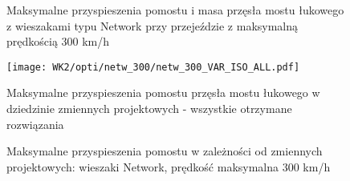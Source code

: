 \begin{figure}[hbt!]
	\centering
	\captionsetup{justification=centering}
	\caption{Maksymalne przyspieszenia pomostu i masa przęsła mostu łukowego z wieszakami typu Network przy przejeździe z maksymalną prędkością 300 km/h}
	\label{fig:wk2_opti_netw_300_variables}
\end{figure}
\begin{figure}[hbt!]
	\centering
	\texttt{[image: WK2/opti/netw\_300/netw\_300\_VAR\_ISO\_ALL.pdf]}
	\captionsetup{justification=centering}
	\caption{Maksymalne przyspieszenia pomostu przęsła mostu łukowego w dziedzinie zmiennych projektowych - wszystkie otrzymane rozwiązania}
	\label{fig:wk2_opti_netw_300_vars_all}
\end{figure}
\begin{figure}[hbt!]
	\centering
	\captionsetup{justification=centering}
	\caption{Maksymalne przyspieszenia pomostu w zależności od zmiennych projektowych: wieszaki Network, prędkość maksymalna 300 km/h}
	\label{fig:wk2_opti_netw_300_var_2d}
\end{figure}

